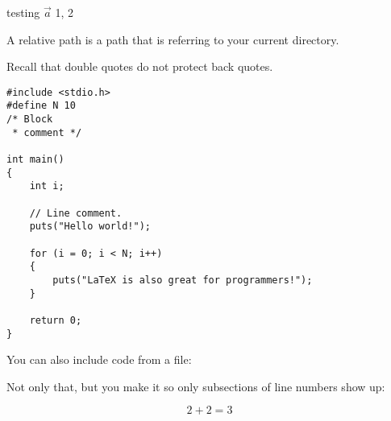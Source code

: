 testing $\vec{a}$ 1, 2

\begin{defn}
	A relative path is a path that is referring to your current directory.
\end{defn}

\begin{rem}
	Recall that double quotes do not protect back quotes.
\end{rem}

\begin{lstlisting}[style=Sublime-C++, caption=C++ Example]
#include <stdio.h>
#define N 10
/* Block
 * comment */
 
int main()
{
    int i;
 
    // Line comment.
    puts("Hello world!");
 
    for (i = 0; i < N; i++)
    {
        puts("LaTeX is also great for programmers!");
    }
 
    return 0;
}
\end{lstlisting}

You can also include code from a file:


Not only that, but you make it so only subsections of line numbers show up:


\begin{exmp}
	$$2+2=3$$
\end{exmp}